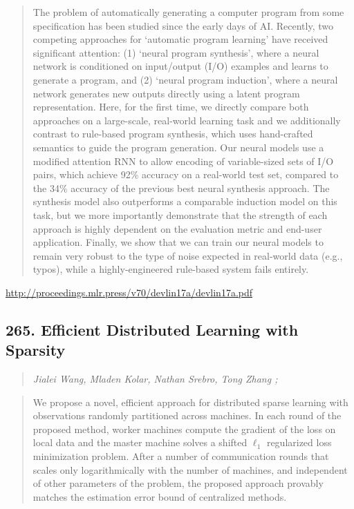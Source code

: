 \documentclass{article}
\begin{document}
\begin{quote}
    The problem of automatically generating a computer program from some specification has been studied since the early days of AI. Recently, two competing approaches for `automatic program learning’ have received significant attention: (1) `neural program synthesis’, where a neural network is conditioned on input/output (I/O) examples and learns to generate a program, and (2) `neural program induction’, where a neural network generates new outputs directly using a latent program representation. Here, for the first time, we directly compare both approaches on a large-scale, real-world learning task and we additionally contrast to rule-based program synthesis, which uses hand-crafted semantics to guide the program generation. Our neural models use a modified attention RNN to allow encoding of variable-sized sets of I/O pairs, which achieve 92\% accuracy on a real-world test set, compared to the 34\% accuracy of the previous best neural synthesis approach. The synthesis model also outperforms a comparable induction model on this task, but we more importantly demonstrate that the strength of each approach is highly dependent on the evaluation metric and end-user application. Finally, we show that we can train our neural models to remain very robust to the type of noise expected in real-world data (e.g., typos), while a highly-engineered rule-based system fails entirely.  \end{quote}

\href{http://proceedings.mlr.press/v70/devlin17a/devlin17a.pdf}{http://proceedings.mlr.press/v70/devlin17a/devlin17a.pdf}

\subsection{265. Efficient Distributed Learning with Sparsity}

\begin{quote}
\footnotesize{\textit{Jialei Wang, Mladen Kolar, Nathan Srebro, Tong Zhang ;}}
\end{quote}

\begin{quote}
    We propose a novel, efficient approach for distributed sparse learning with observations randomly partitioned across machines. In each round of the proposed method, worker machines compute the gradient of the loss on local data and the master machine solves a shifted $\ell_1$ regularized loss minimization problem. After a number of communication rounds that scales only logarithmically with the number of machines, and independent of other parameters of the problem, the proposed approach provably matches the estimation error bound of centralized methods.  \end{quote}
\end{document}
